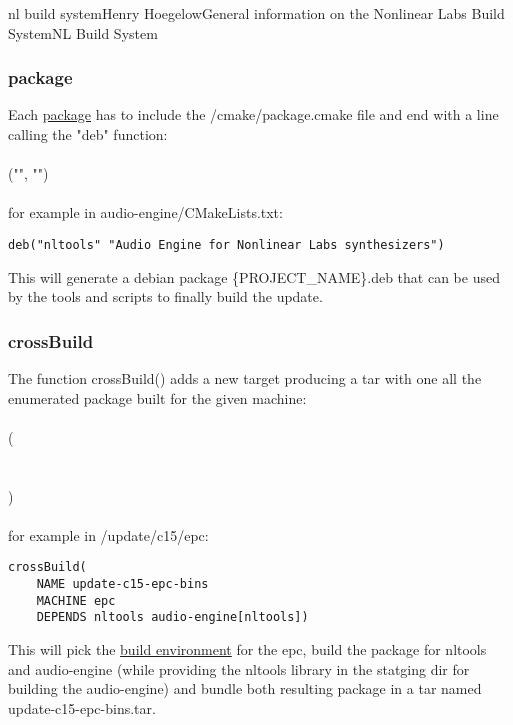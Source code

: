 \documentclass[11pt]{article}
\begin{document}
\begin{Name}{1}{nl build system}{Henry Hoegelow}{General information on the Nonlinear Labs Build System}{NL Build System}
\subsubsection{package} \label{cmake-package}
Each \hyperref[package]{package} has to include the /cmake/package.cmake file and end with a line calling the "deb" function:\\
\\
("", "")\\
\\
for example in audio-engine/CMakeLists.txt:
\begin{verbatim}
deb("nltools" "Audio Engine for Nonlinear Labs synthesizers")
\end{verbatim}
This will generate a debian package \{PROJECT\_NAME\}.deb that can be used by the tools and scripts to finally build the update.

\subsubsection{crossBuild} \label{crossbuild}
The function crossBuild() adds a new target producing a tar with one all the enumerated package built for the given machine:\\
\\
(\\
\indent{}\\
\indent{}\\
\indent{})\\
\\
for example in /update/c15/epc:
\begin{verbatim}
crossBuild(
    NAME update-c15-epc-bins 
    MACHINE epc
    DEPENDS nltools audio-engine[nltools])
\end{verbatim}
This will pick the \hyperref[buildenv]{build environment} for the epc, build the package for nltools and audio-engine (while providing the nltools library in the statging dir for building the audio-engine) and bundle both resulting package in a tar named update-c15-epc-bins.tar.


\end{Name}
\end{document}
